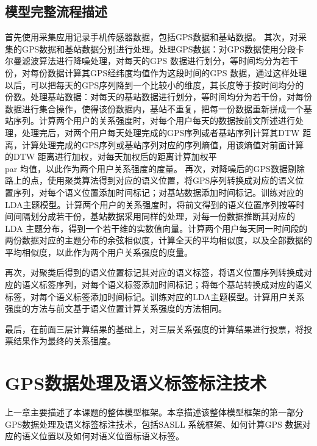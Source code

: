 \section{模型完整流程描述}
\label{sec:section7-2}
首先使用采集应用记录手机传感器数据，包括GPS数据和基站数据。
其次，对采集的GPS数据和基站数据分别进行处理。处理GPS数据：对GPS数据使用分段卡尔曼滤波算法进行降噪处理，对每天的GPS 数据进行划分，等时间均分为若干份，对每份数据计算其GPS经纬度均值作为这段时间的GPS 数据，通过这样处理以后，可以把每天的GPS序列降到一个比较小的维度，其长度等于按时间均分的份数。处理基站数据：对每天的基站数据进行划分，等时间均分为若干份，对每份数据进行集合操作，使得该份数据内，基站不重复，把每一份数据重新拼成一个基站序列。计算两个用户的关系强度时，对每个用户每天的数据按前文所述进行处理，处理完后，对两个用户每天处理完成的GPS序列或者基站序列计算其DTW 距离，计算处理完成的GPS序列或基站序列对应的序列熵值，用该熵值对前面计算的DTW 距离进行加权，对每天加权后的距离计算加权平\\par 均值，以此作为两个用户关系强度的度量。
再次，对降噪后的GPS数据剔除路上的点，使用聚类算法得到对应的语义位置，将GPS序列转换成对应的语义位置序列，对每个语义位置添加时间标记；对基站数据添加时间标记。训练对应的LDA主题模型。计算两个用户的关系强度时，将前文得到的语义位置序列按等时间间隔划分成若干份，基站数据采用同样的处理，对每一份数据推断其对应的LDA 主题分布，得到一个若干维的实数值向量。计算两个用户每天同一时间段的两份数据对应的主题分布的余弦相似度，计算全天的平均相似度，以及全部数据的平均相似度，以此作为两个用户关系强度的度量。
\par 再次，对聚类后得到的语义位置标记其对应的语义标签，将语义位置序列转换成对应的语义标签序列，对每个语义标签添加时间标记；将每个基站转换成对应的语义标签，对每个语义标签添加时间标记。训练对应的LDA主题模型。计算用户关系强度的方法与前文基于语义位置计算关系强度的方法相同。
\par 最后，在前面三层计算结果的基础上，对三层关系强度的计算结果进行投票，将投票结果作为最终的关系强度。
\chapter{GPS数据处理及语义标签标注技术}
\label{chap:chapter03}
上一章主要描述了本课题的整体模型框架。本章描述该整体模型框架的第一部分GPS数据处理及语义标签标注技术，包括SASLL 系统框架、如何计算GPS 数据对应的语义位置以及如何对语义位置标语义标签。
